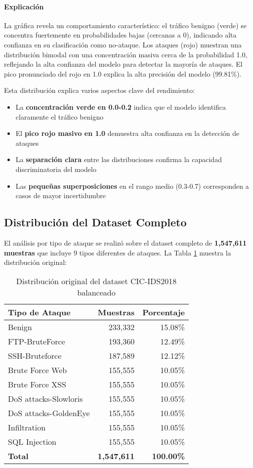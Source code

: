 \paragraph{Explicación}
La gráfica revela un comportamiento característico: el tráfico benigno (verde) se concentra fuertemente en probabilidades bajas (cercanas a 0), indicando alta confianza en su clasificación como no-ataque. Los ataques (rojo) muestran una distribución bimodal con una concentración masiva cerca de la probabilidad 1.0, reflejando la alta confianza del modelo para detectar la mayoría de ataques. El pico pronunciado del rojo en 1.0 explica la alta precisión del modelo (99.81\%).

Esta distribución explica varios aspectos clave del rendimiento:
\begin{itemize}
\item La \textbf{concentración verde en 0.0-0.2} indica que el modelo identifica claramente el tráfico benigno
\item El \textbf{pico rojo masivo en 1.0} demuestra alta confianza en la detección de ataques
\item La \textbf{separación clara} entre las distribuciones confirma la capacidad discriminatoria del modelo
\item Las \textbf{pequeñas superposiciones} en el rango medio (0.3-0.7) corresponden a casos de mayor incertidumbre
\end{itemize}

\subsection{Distribución del Dataset Completo}

El análisis por tipo de ataque se realizó sobre el dataset completo de \textbf{1,547,611 muestras} que incluye 9 tipos diferentes de ataques. La Tabla \ref{tab:dataset_distribution} muestra la distribución original:

\begin{table}[H]
\centering
\begin{tabular}{lrr}
\toprule
\textbf{Tipo de Ataque} & \textbf{Muestras} & \textbf{Porcentaje} \\
\midrule
Benign & 233,332 & 15.08\% \\
FTP-BruteForce & 193,360 & 12.49\% \\
SSH-Bruteforce & 187,589 & 12.12\% \\
Brute Force Web & 155,555 & 10.05\% \\
Brute Force XSS & 155,555 & 10.05\% \\
DoS attacks-Slowloris & 155,555 & 10.05\% \\
DoS attacks-GoldenEye & 155,555 & 10.05\% \\
Infiltration & 155,555 & 10.05\% \\
SQL Injection & 155,555 & 10.05\% \\
\midrule
\textbf{Total} & \textbf{1,547,611} & \textbf{100.00\%} \\
\bottomrule
\end{tabular}
\caption{Distribución original del dataset CIC-IDS2018 balanceado}
\label{tab:dataset_distribution}
\end{table}

